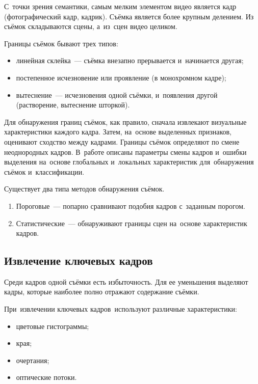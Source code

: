 С~точки зрения семантики, самым мелким элементом видео является кадр
(фотографический кадр, кадрик).
Съёмка является более крупным делением.
Из съёмок складываются сцены, а~из~сцен видео целиком.

Границы съёмок бывают трех типов:
\begin{itemize}
    \item линейная склейка~— съёмка внезапно прерывается и~начинается другая;
    \item постепенное исчезновение или проявление (в монохромном кадре);
    \item вытеснение~— исчезновения одной съёмки, и~появления другой
        (растворение, вытеснение шторкой).
\end{itemize}

Для обнаружения границ съёмок, как правило,
сначала извлекают визуальные характеристики каждого кадра.
Затем, на~основе выделенных признаков, оценивают сходство между кадрами.
Границы съёмок определяют по смене неоднородных кадров.
В~работе \cite{Nigay:1993} описаны параметры смены кадров
и~ошибки выделения на~основе глобальных и~локальных характеристик
для~обнаружения съёмок и~классификации.

Существует два типа методов обнаружения съёмок.
\begin{enumerate}
    \item Пороговые~— попарно сравнивают подобия кадров с~заданным порогом.
    \item Статистические~— обнаруживают границы сцен на~основе характеристик кадров.
\end{enumerate}

\subsection{Извлечение ключевых кадров}

Среди кадров одной съёмки есть избыточность.
Для ее уменьшения выделяют кадры,
которые наиболее полно отражают содержание съёмки.

При~извлечении ключевых кадров\
используют различные характеристики:
\begin{itemize}
    \item цветовые гистограммы;
    \item края;
    \item очертания;
    \item оптические потоки.
\end{itemize}

